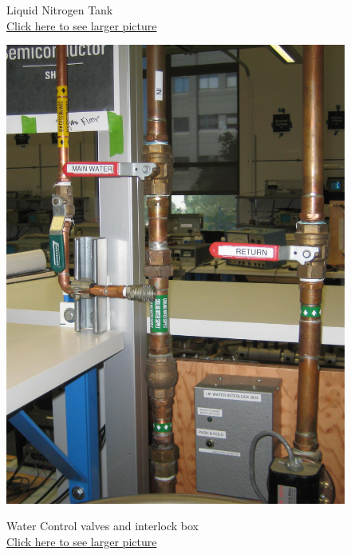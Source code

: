 \documentclass{../lab}
\begin{document}
\begin{figure}[H]
  \caption{Liquid Nitrogen Tank \\
  \href{http://experimentationlab.berkeley.edu/sites/default/files/images/SHE_LN-2_Crop_3542.jpg.jpg}{Click here to see larger picture}}
  \label{fig:SHE_LN-2_Crop_3542.jpg}
\endminipage\hfill
{}
  \href{http://experimentationlab.berkeley.edu/sites/default/files/images/SHE_Water_Crop_3544.jpg}{\includegraphics[width=\linewidth,keepaspectratio]{images/SHE_Water_Crop_3544.jpg}}
  \caption{Water Control valves and interlock box \\ \href{http://experimentationlab.berkeley.edu/sites/default/files/images/SHE_Water_Crop_3544.jpg}{Click here to see larger picture}}\label{fig:SHE_Water_Crop_3544.jpg}
\endminipage\hfill
{}

\end{figure}
\end{document}
